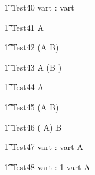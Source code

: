 \begin{circusaction}
   \t1 Test40 \circdef \circvres vart : \nat  \circspot  \circwait  vart \\
\end{circusaction}


\begin{circusaction}
   \t1 Test41 \circdef  A \circseq {}   \\
\end{circusaction}

\begin{circusaction}
   \t1 Test42 \circdef  (A \circseq B) \circseq {} \\
\end{circusaction}

\begin{circusaction}
   \t1 Test43 \circdef  A \circseq (B \circseq {}) \\
\end{circusaction}

\begin{circusaction}
   \t1 Test44 \circdef  {} \circseq A \\
\end{circusaction}

\begin{circusaction}
   \t1 Test45 \circdef  {} \circseq (A \circseq B) \\
\end{circusaction}

\begin{circusaction}
   \t1 Test46 \circdef  ( \circseq A) \circseq B \\
\end{circusaction}


\begin{circusaction}
   \t1 Test47 \circdef \circvres vart : \nat  \circspot  \circwait  vart  A \\
\end{circusaction}

\begin{circusaction}
   \t1 Test48 \circdef \circvres vart : 1   \circspot  \circwait  vart  A \\
\end{circusaction}

